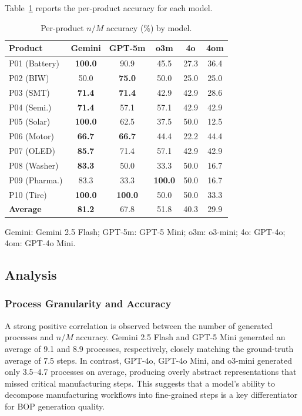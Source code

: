 Table~\ref{tab:product_results} reports the per-product accuracy for each model.

\begin{table}[htbp]
\centering
\caption{Per-product $n/M$ accuracy (\%) by model.}
\label{tab:product_results}
\begin{tabular}{lccccc}
\hline
\textbf{Product} & \textbf{Gemini} & \textbf{GPT-5m} & \textbf{o3m} & \textbf{4o} & \textbf{4om} \\
\hline
P01 (Battery)    & \textbf{100.0} & 90.9 & 45.5 & 27.3 & 36.4 \\
P02 (BIW)        & 50.0  & \textbf{75.0} & 50.0 & 25.0 & 25.0 \\
P03 (SMT)        & \textbf{71.4} & \textbf{71.4} & 42.9 & 42.9 & 28.6 \\
P04 (Semi.)      & \textbf{71.4} & 57.1 & 57.1 & 42.9 & 42.9 \\
P05 (Solar)      & \textbf{100.0} & 62.5 & 37.5 & 50.0 & 12.5 \\
P06 (Motor)      & \textbf{66.7} & \textbf{66.7} & 44.4 & 22.2 & 44.4 \\
P07 (OLED)       & \textbf{85.7} & 71.4 & 57.1 & 42.9 & 42.9 \\
P08 (Washer)     & \textbf{83.3} & 50.0 & 33.3 & 50.0 & 16.7 \\
P09 (Pharma.)    & 83.3 & 33.3 & \textbf{100.0} & 50.0 & 16.7 \\
P10 (Tire)       & \textbf{100.0} & \textbf{100.0} & 50.0 & 50.0 & 33.3 \\
\hline
\textbf{Average} & \textbf{81.2} & 67.8 & 51.8 & 40.3 & 29.9 \\
\hline
\end{tabular}
\begin{tablenotes}
\small
\item Gemini: Gemini 2.5 Flash; GPT-5m: GPT-5 Mini; o3m: o3-mini; 4o: GPT-4o; 4om: GPT-4o Mini.
\end{tablenotes}
\end{table}

\subsection{Analysis}

\subsubsection{Process Granularity and Accuracy}

A strong positive correlation is observed between the number of generated processes and $n/M$ accuracy.
Gemini 2.5 Flash and GPT-5 Mini generated an average of 9.1 and 8.9 processes, respectively, closely matching the ground-truth average of 7.5 steps.
In contrast, GPT-4o, GPT-4o Mini, and o3-mini generated only 3.5--4.7 processes on average, producing overly abstract representations that missed critical manufacturing steps.
This suggests that a model's ability to decompose manufacturing workflows into fine-grained steps is a key differentiator for BOP generation quality.

